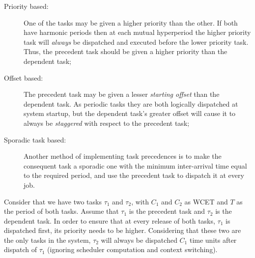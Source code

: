 \begin{description}
\item[Priority based:]{One of the tasks may be given a higher priority
  than the other. If both have harmonic periods then at each mutual
  hyperperiod the higher priority task will \emph{always} be
  dispatched and executed before the lower priority task. Thus, the
  precedent task should be given a higher priority than the dependent
  task;}
\item[Offset based:]{The precedent task may be given a lesser
  \emph{starting offset} than the dependent task. As periodic tasks
  they are both logically dispatched at system startup, but the
  dependent task's greater offset will cause it to always be
  \emph{staggered} with respect to the precedent task;}
\item[Sporadic task based:]{Another method of implementing task
  precedences is to make the consequent task a sporadic one with the
  minimum inter-arrival time equal to the required period, and use the
  precedent task to dispatch it at every job.}
\end{description}

Consider that we have two tasks $\tau_1$ and $\tau_2$, with $C_1$ and
$C_2$ as WCET and $T$ as the period of both tasks. Assume that
$\tau_1$ is the precedent task and $\tau_2$ is the dependent task. In
order to ensure that at every release of both tasks, $\tau_1$ is
dispatched first, its priority needs to be higher. Considering that
these two are the only tasks in the system, $\tau_2$ will always be
dispatched $C_1$ time units after dispatch of $\tau_1$ (ignoring
scheduler computation and context switching).

